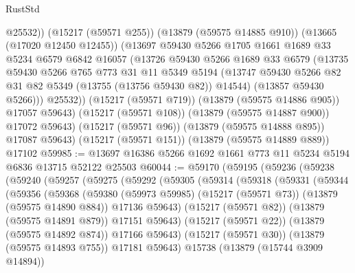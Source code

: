 \begin{lexlean}{RustStd}
\begin{coremodule}
                @25532))
            (@15217 (@59571 @255))
            (@13879 (@59575 @14885 @910))
            (@13665 (@17020 @12450 @12455))
            (@13697
              @59430
              @5266
              @1705
              @1661
              @1689
              @33
              @5234
              @6579
              @6842
              @16057
              (@13726
                @59430
                @5266
                @1689
                @33
                @6579
                (@13735
                  @59430
                  @5266
                  @765
                  @773
                  @31
                  @11
                  @5349
                  @5194
                  (@13747 @59430 @5266 @82 @31 @82 @5349 (@13755 (@13756 @59430 @82)) @14544)
                  (@13857 @59430 @5266)))
              @25532))
          (@15217 (@59571 @719))
          (@13879 (@59575 @14886 @905))
          @17057
          @59643)
        (@15217 (@59571 @108))
        (@13879 (@59575 @14887 @900))
        @17072
        @59643)
      (@15217 (@59571 @96))
      (@13879 (@59575 @14888 @895))
      @17087
      @59643)
    (@15217 (@59571 @151))
    (@13879 (@59575 @14889 @889))
    @17102
@59985 := @13697 @16386 @5266 @1692 @1661 @773 @11 @5234 @5194 @6836 @13715 @52122 @25503
@60044 := @59170
    (@59195
      (@59236
        (@59238
          (@59240
            (@59257
              (@59275
                (@59292
                  (@59305
                    (@59314
                      (@59318
                        (@59331
                          (@59344
                            (@59356
                              (@59368
                                (@59380
                                  (@59973 @59985)
                                  (@15217 (@59571 @73))
                                  (@13879 (@59575 @14890 @884))
                                  @17136
                                  @59643)
                                (@15217 (@59571 @82))
                                (@13879 (@59575 @14891 @879))
                                @17151
                                @59643)
                              (@15217 (@59571 @22))
                              (@13879 (@59575 @14892 @874))
                              @17166
                              @59643)
                            (@15217 (@59571 @30))
                            (@13879 (@59575 @14893 @755))
                            @17181
                            @59643)
                          @15738
                          (@13879 (@15744 @3909 @14894))

\end{coremodule}
\end{lexlean}
